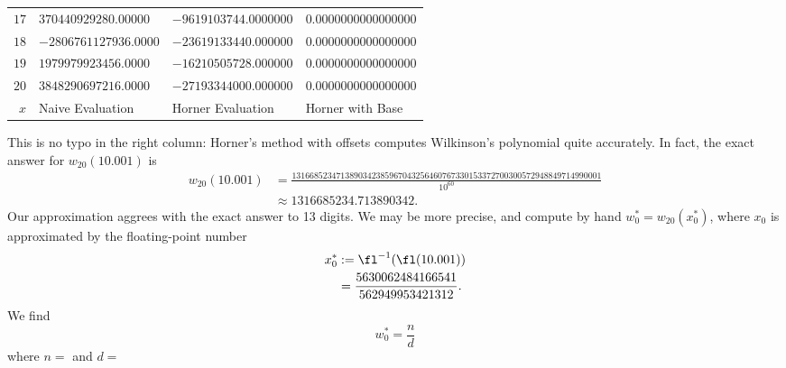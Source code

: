 \begin{ex}
\begin{center}
\begin{longtable}{r|l|l|l}
$17$ &$370440929280.00000$ &$-9619103744.0000000$ &$0.0000000000000000$ \\
$18$ &$-2806761127936.0000$ &$-23619133440.000000$ &$0.0000000000000000$ \\
$19$ &$1979979923456.0000$ &$-16210505728.000000$ &$0.0000000000000000$ \\
$20$ &$3848290697216.0000$ &$-27193344000.000000$ &$0.0000000000000000$ \\
 \hline
$x$ & Naive Evaluation & Horner Evaluation & Horner with Base
 \end{longtable}
  \end{center}
This is no typo in the right column: Horner's method with offsets
computes Wilkinson's polynomial quite accurately. In fact, the exact
answer for $w_{20}(10.001)$ is
\begin{align}
  w_{20}(10.001) &= \frac{1316685234713890342385967043256460767330153372700300572948849714990001}
    {10^{60}}\nonumber\\
    &\approx 1316685234.713890342.
\end{align}
  Our approximation aggrees with the exact answer to 13 digits. We may
  be more precise, and compute by hand $w_{0}^{*}=w_{20}(x_{0}^{*})$, where
  $x_{0}$ is approximated by the floating-point number
  \begin{equation}
    \begin{split}
      x_{0}^{*} &:= \fl^{-1}(\fl(10.001))\\
      &=\frac{5630062484166541}{562949953421312}.
    \end{split}
  \end{equation}
  We find
  \begin{equation}
    w_{0}^{*} = \frac{n}{d}
  \end{equation}
  where
  \medbreak
  \begingroup
\noindent $n =$ 
\endgroup
\medbreak
\noindent and
\medbreak
  \begingroup
\noindent $d =$ 
  \endgroup
  \medbreak\noindent%

\end{ex}

